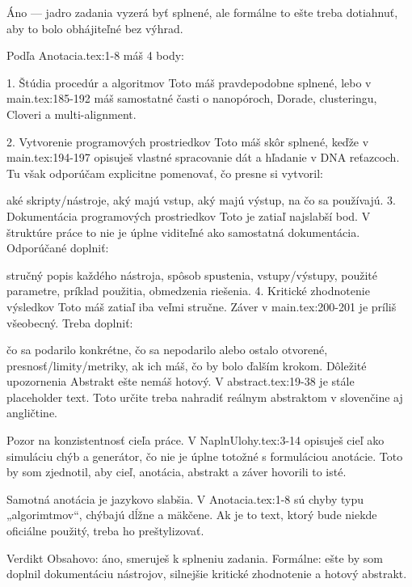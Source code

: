 Áno — jadro zadania vyzerá byť splnené, ale formálne to ešte treba dotiahnuť, aby to bolo obhájiteľné bez výhrad.

Podľa Anotacia.tex:1-8 máš 4 body:

1. Štúdia procedúr a algoritmov
Toto máš pravdepodobne splnené, lebo v main.tex:185-192 máš samostatné časti o nanopóroch, Dorade, clusteringu, Cloveri a multi-alignment.

2. Vytvorenie programových prostriedkov
Toto máš skôr splnené, keďže v main.tex:194-197 opisuješ vlastné spracovanie dát a hľadanie v DNA reťazcoch.
Tu však odporúčam explicitne pomenovať, čo presne si vytvoril:

aké skripty/nástroje,
aký majú vstup,
aký majú výstup,
na čo sa používajú.
3. Dokumentácia programových prostriedkov
Toto je zatiaľ najslabší bod. V štruktúre práce to nie je úplne viditeľné ako samostatná dokumentácia.
Odporúčané doplniť:

stručný popis každého nástroja,
spôsob spustenia,
vstupy/výstupy,
použité parametre,
príklad použitia,
obmedzenia riešenia.
4. Kritické zhodnotenie výsledkov
Toto máš zatiaľ iba veľmi stručne. Záver v main.tex:200-201 je príliš všeobecný.
Treba doplniť:

čo sa podarilo konkrétne,
čo sa nepodarilo alebo ostalo otvorené,
presnosť/limity/metriky, ak ich máš,
čo by bolo ďalším krokom.
Dôležité upozornenia
Abstrakt ešte nemáš hotový.
V abstract.tex:19-38 je stále placeholder text. Toto určite treba nahradiť reálnym abstraktom v slovenčine aj angličtine.

Pozor na konzistentnosť cieľa práce.
V NaplnUlohy.tex:3-14 opisuješ cieľ ako simuláciu chýb a generátor, čo nie je úplne totožné s formuláciou anotácie. Toto by som zjednotil, aby cieľ, anotácia, abstrakt a záver hovorili to isté.

Samotná anotácia je jazykovo slabšia.
V Anotacia.tex:1-8 sú chyby typu „algorimtmov“, chýbajú dĺžne a mäkčene. Ak je to text, ktorý bude niekde oficiálne použitý, treba ho preštylizovať.

Verdikt
Obsahovo: áno, smeruješ k splneniu zadania.
Formálne: ešte by som doplnil dokumentáciu nástrojov, silnejšie kritické zhodnotenie a hotový abstrakt.

